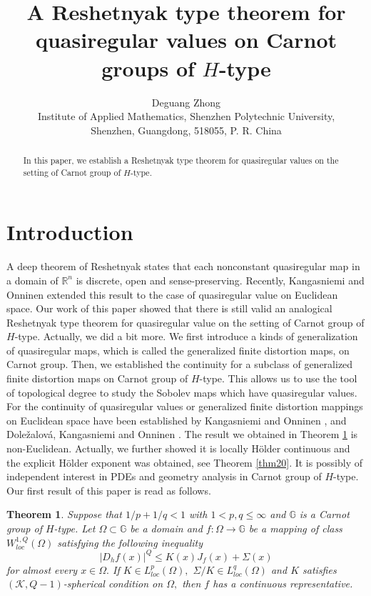 \documentclass[11pt,twoside]{article}
\title{A Reshetnyak type theorem for quasiregular values on Carnot groups of $H$-type}
\author{Deguang Zhong \\Institute of Applied Mathematics, Shenzhen Polytechnic University,\\
Shenzhen, Guangdong, 518055, P. R. China\\}
\date{}
\newtheorem{thm}{Theorem}[section]
\theoremstyle{definition}
\theoremstyle{remark}
\newcommand{\ntt}{%
  \fontfamily\ttdefault \fontseries\mddefault \fontshape\updefault
  \selectfont
}
\DeclareRobustCommand{\pkg}[1]{{\ntt#1}}
\begin{document}
\maketitle
\begin{abstract}
In this paper, we establish a Reshetnyak type theorem for quasiregular values on the setting of Carnot group of $H$-type.
\end{abstract}
\begingroup
\small
\tableofcontents
\endgroup


\newpage %

\section{Introduction}
 A  deep theorem of Reshetnyak states that each nonconstant quasiregular map in a domain of $\mathbb{R}^{n}$ is discrete, open and sense-preserving. Recently, Kangasniemi and  Onninen \cite[Theorem 1.2]{KO222} extended this result to the case of quasiregular value on Euclidean space. Our work of this paper showed that there is still valid an analogical Reshetnyak type theorem for quasiregular value on the setting of Carnot group of $H$-type.  Actually, we did a bit more. We first introduce a kinds of generalization of quasiregular maps, which is called the generalized finite distortion maps, on  Carnot group.  Then, we established the continuity for a subclass of generalized finite distortion maps on Carnot group of $H$-type. This allows us to use the tool of topological degree to study the Sobolev maps which have quasiregular values.  
  For the continuity of quasiregular values or generalized finite distortion mappings on Euclidean space have been established by  Kangasniemi and  Onninen \cite{KO221},  and 
 Dole\v{z}alov\'{a},  Kangasniemi and  Onninen \cite{DKO24}. The  result we obtained in Theorem \ref{6666312} is non-Euclidean. Actually, we further showed it is locally H\"{o}lder continuous and the explicit H\"{o}lder exponent was obtained, see Theorem \ref{thm20}. It is possibly of independent interest in PDEs and geometry analysis in Carnot group of $H$-type. Our first result of this paper is read as follows.
 \begin{thm}\label{6666312}
 Suppose that  $1/p+1/q<1$ with $1<p,q\leq\infty$ and $\mathbb{G}$ is a Carnot group of $H$-type. Let $\Omega\subset \mathbb{G}$ be a domain and $f:\Omega\rightarrow \mathbb{G}$ be a mapping of class $W_{loc}^{1,Q}(\Omega)$ satisfying  the following inequality
\begin{equation}\label{----1}
\vert D_{h}f(x)\vert^{Q}\leq K(x)J_{f}(x)+\Sigma(x)
\end{equation}
for almost every $x\in\Omega.$ If $K\in L_{loc}^{p}(\Omega),$ $\Sigma/K\in L_{loc}^{q}(\Omega)$ and $K$ satisfies $(\mathcal{K},Q-1)$-spherical condition on $\Omega,$
 then $f$ has a continuous representative. 
\end{thm}
\end{document}
